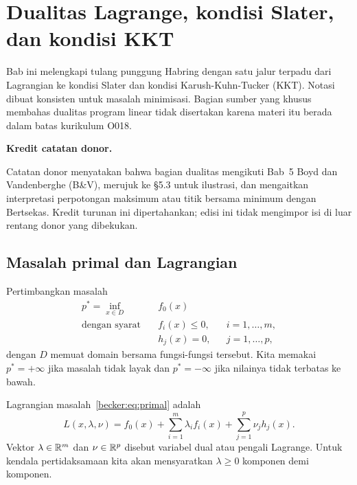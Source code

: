 \chapter{Dualitas Lagrange, kondisi Slater, dan kondisi KKT}
\label{becker:chapter:lagrange-kkt}

Bab ini melengkapi tulang punggung Habring dengan satu jalur terpadu dari
Lagrangian ke kondisi Slater dan kondisi Karush-Kuhn-Tucker (KKT). Notasi
dibuat konsisten untuk masalah minimisasi. Bagian sumber yang khusus membahas
dualitas program linear tidak disertakan karena materi itu berada dalam batas
kurikulum O018.

\noindent\textbf{Kredit catatan donor.}\par
Catatan donor menyatakan bahwa bagian
dualitas mengikuti Bab~5 Boyd dan Vandenberghe (B\&V), merujuk ke
\S5.3 untuk ilustrasi, dan mengaitkan interpretasi perpotongan maksimum atau
titik bersama minimum dengan Bertsekas. Kredit turunan ini dipertahankan;
edisi ini tidak mengimpor isi di luar rentang donor yang dibekukan.

\section{Masalah primal dan Lagrangian}

Pertimbangkan masalah
\begin{equation}
  \label{becker:eq:primal}
  \begin{aligned}
    p^* = \inf_{x\in D}\quad & f_0(x)\\
    \text{dengan syarat}\quad & f_i(x)\leq 0, && i=1,\ldots,m,\\
    & h_j(x)=0, && j=1,\ldots,p,
  \end{aligned}
\end{equation}
dengan $D$ memuat domain bersama fungsi-fungsi tersebut. Kita memakai
$p^*=+\infty$ jika masalah tidak layak dan $p^*=-\infty$ jika nilainya tidak
terbatas ke bawah.

\begin{defn}[Lagrangian]
  Lagrangian masalah~\eqref{becker:eq:primal} adalah
  \begin{equation}
    \label{becker:eq:lagrangian}
    L(x,\lambda,\nu)
    = f_0(x)+\sum_{i=1}^{m}\lambda_i f_i(x)
      +\sum_{j=1}^{p}\nu_j h_j(x).
  \end{equation}
  Vektor $\lambda\in\mathbb{R}^m$ dan $\nu\in\mathbb{R}^p$ disebut variabel dual atau
  pengali Lagrange. Untuk kendala pertidaksamaan kita akan mensyaratkan
  $\lambda\geq0$ komponen demi komponen.
\end{defn}

